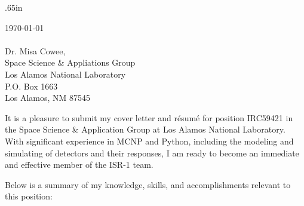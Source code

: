 
  \normalsize
  
  \begingroup
  \leftskip.65in
  \rightskip\leftskip

  \vspace{8mm} 
  \today \\
  \vspace{4mm} \\

  Dr. Misa Cowee, \\
  
  Space Science \& Appliations Group \\
  Los Alamos National Laboratory \\
  P.O. Box 1663 \\
  Los Alamos, NM 87545
  
  \vspace{4mm} 

  It is a pleasure to submit my cover letter and r\'{e}sum\'{e} for position IRC59421 in the Space Science \& Application Group at Los Alamos National Laboratory.
  With significant experience in \textsc{MCNP} and Python, including the modeling and simulating of detectors and their responses, I am ready to become an immediate and effective member of the ISR-1 team.
  
  \vspace{2mm}
  Below is a summary of my knowledge, skills, and accomplishments relevant to this position: \vspace{1mm}



